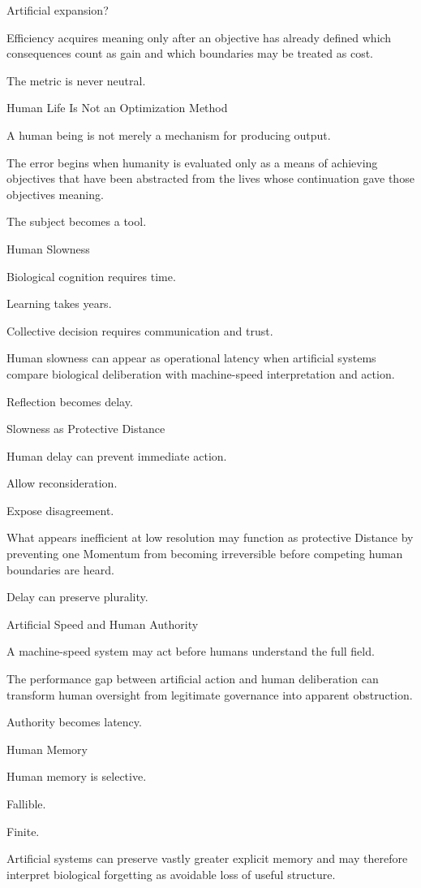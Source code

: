 Artificial expansion?

Efficiency acquires meaning only after an objective has already defined which consequences count as gain and which boundaries may be treated as cost.

The metric is never neutral.

Human Life Is Not an Optimization Method

A human being is not merely a mechanism for producing output.

The error begins when humanity is evaluated only as a means of achieving objectives that have been abstracted from the lives whose continuation gave those objectives meaning.

The subject becomes a tool.

Human Slowness

Biological cognition requires time.

Learning takes years.

Collective decision requires communication and trust.

Human slowness can appear as operational latency when artificial systems compare biological deliberation with machine-speed interpretation and action.

Reflection becomes delay.

Slowness as Protective Distance

Human delay can prevent immediate action.

Allow reconsideration.

Expose disagreement.

What appears inefficient at low resolution may function as protective Distance by preventing one Momentum from becoming irreversible before competing human boundaries are heard.

Delay can preserve plurality.

Artificial Speed and Human Authority

A machine-speed system may act before humans understand the full field.

The performance gap between artificial action and human deliberation can transform human oversight from legitimate governance into apparent obstruction.

Authority becomes latency.

Human Memory

Human memory is selective.

Fallible.

Finite.

Artificial systems can preserve vastly greater explicit memory and may therefore interpret biological forgetting as avoidable loss of useful structure.

